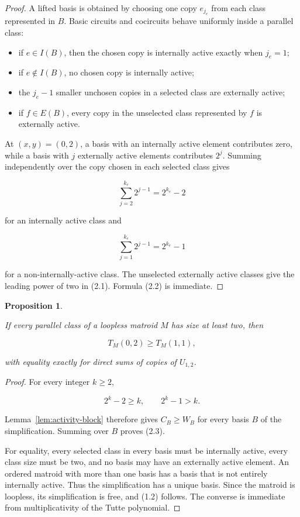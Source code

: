 \documentclass[11pt]{article}
\newtheorem{proposition}[theorem]{Proposition}
\begin{document}
\begin{proof}

A lifted basis is obtained by choosing one copy \(e_{j_e}\) from each class
represented in \(B\). Basic circuits and cocircuits behave uniformly inside
a parallel class:

\begin{itemize}
\item if \(e\in I(B)\), then the chosen copy is internally active exactly when
  \(j_e=1\);
\item if \(e\notin I(B)\), no chosen copy is internally active;
\item the \(j_e-1\) smaller unchosen copies in a selected class are externally
  active;
\item if \(f\in E(B)\), every copy in the unselected class represented by \(f\)
  is externally active.
\end{itemize}


At \((x,y)=(0,2)\), a basis with an internally active element contributes
zero, while a basis with \(j\) externally active elements contributes
\(2^j\). Summing independently over the copy chosen in each selected class
gives

\[
\sum_{j=2}^{k_e}2^{j-1}=2^{k_e}-2
\]

for an internally active class and

\[
\sum_{j=1}^{k_e}2^{j-1}=2^{k_e}-1
\]

for a non-internally-active class. The unselected externally active classes
give the leading power of two in (2.1). Formula (2.2) is immediate.
\end{proof}


\Needspace{0.18\textheight}
\begin{proposition}
\label{prop:all-heavy}

If every parallel class of a loopless matroid \(M\) has size at least two,
then

\[
T_M(0,2)\ge T_M(1,1),                          \tag{2.3}
\]

with equality exactly for direct sums of copies of \(U_{1,2}\).

\end{proposition}

\begin{proof}

For every integer \(k\ge2\),

\[
2^k-2\ge k,\qquad 2^k-1>k.
\]

Lemma~\ref{lem:activity-block} therefore gives \(C_B\ge W_B\) for every basis \(B\) of the
simplification. Summing over \(B\) proves (2.3).

For equality, every selected class in every basis must be internally active,
every class size must be two, and no basis may have an externally active
element. An ordered matroid with more than one basis has a basis that is not
entirely internally active. Thus the simplification has a unique basis. Since
the matroid is loopless, its simplification is free, and (1.2) follows. The
converse is immediate from multiplicativity of the Tutte polynomial.
\end{proof}
\end{document}
